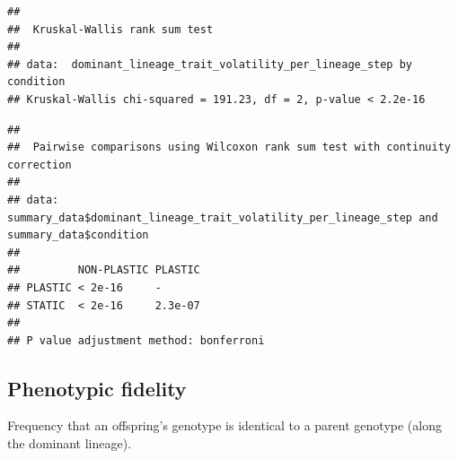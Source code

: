 \documentclass[]{book}
\newenvironment{Shaded}{\begin{snugshade}}{\end{snugshade}}
\newcommand{\DataTypeTok}[1]{\textcolor[rgb]{0.13,0.29,0.53}{#1}}
\newcommand{\KeywordTok}[1]{\textcolor[rgb]{0.13,0.29,0.53}{\textbf{#1}}}
\newcommand{\NormalTok}[1]{#1}
\newcommand{\OperatorTok}[1]{\textcolor[rgb]{0.81,0.36,0.00}{\textbf{#1}}}
\newcommand{\StringTok}[1]{\textcolor[rgb]{0.31,0.60,0.02}{#1}}
\begin{document}
\begin{verbatim}
## 
##  Kruskal-Wallis rank sum test
## 
## data:  dominant_lineage_trait_volatility_per_lineage_step by condition
## Kruskal-Wallis chi-squared = 191.23, df = 2, p-value < 2.2e-16
\end{verbatim}

\begin{Shaded}
\end{Shaded}

\begin{verbatim}
## 
##  Pairwise comparisons using Wilcoxon rank sum test with continuity correction 
## 
## data:  summary_data$dominant_lineage_trait_volatility_per_lineage_step and summary_data$condition 
## 
##         NON-PLASTIC PLASTIC
## PLASTIC < 2e-16     -      
## STATIC  < 2e-16     2.3e-07
## 
## P value adjustment method: bonferroni
\end{verbatim}

\hypertarget{phenotypic-fidelity}{%
\subsection{Phenotypic fidelity}\label{phenotypic-fidelity}}

Frequency that an offspring's genotype is identical to a parent genotype (along the dominant lineage).
\end{document}
